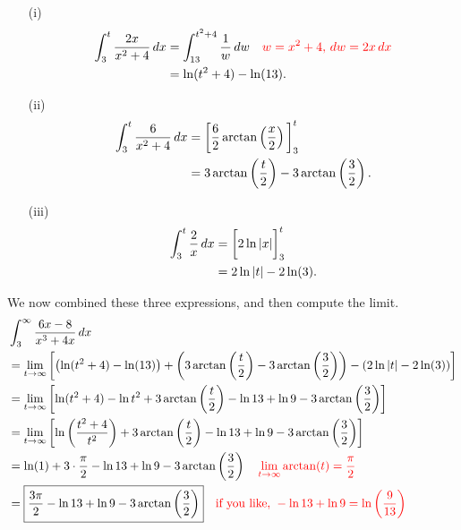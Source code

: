 \documentclass{ximera}
\begin{document}
\begin{problem}
\begin{enumerate}
\begin{freeResponse}
\begin{enumerate}
		\begin{enumerate}
		\item[(i)]  \begin{align*}
		\int_3^t \frac{2x}{x^2+4} \,d x &= \int_{13}^{t^2+4} \frac{1}{w} \,d w	\quad	{\color{red}w=x^2+4, \,dw = 2x \,dx}  \\
		&= \ln(t^2 +4) - \ln(13).
		\end{align*}
		
		\item[(ii)]  \begin{align*}
		\int_3^t \frac{6}{x^2+4} \,d x &= \bigg[ \frac{6}{2} \arctan \left( \frac{x}{2} \right)  \bigg]_3^t  \\
		&= 3 \arctan \left(\frac{t}{2} \right) - 3 \arctan \left( \frac{3}{2} \right).
		\end{align*}
		
		\item[(iii)]  \begin{align*}
		\int_3^t \frac{2}{x} \,d x &= \bigg[  2 \ln|x|  \bigg]_3^t  \\
		&= 2 \ln|t| - 2\ln(3).
		\end{align*}
		
		\end{enumerate}
	We now combined these three expressions, and then compute the limit.
		\begin{align*}
		&\int_3^\infty \frac{6x-8}{x^3+4x} \,d x  \\
		&= \lim_{t \to \infty} \left[ \left(\ln(t^2 +4) - \ln(13) \right) + \left( 3 \arctan \left(\frac{t}{2} \right) - 3 \arctan \left( \frac{3}{2} \right) \right) - \left( 2 \ln|t| - 2\ln(3) \right) \right]  \\
		&= \lim_{t \to \infty} \left[ \ln(t^2+4) - \ln t^2 + 3 \arctan \left( \frac{t}{2} \right) - \ln 13 + \ln 9 - 3 \arctan \left( \frac{3}{2} \right) \right]  \\
		&= \lim_{t \to \infty} \left[ \ln \left( \frac{t^2+4}{t^2} \right) + 3 \arctan \left( \frac{t}{2} \right) - \ln 13 + \ln 9 - 3 \arctan \left( \frac{3}{2} \right) \right]  \\
		&= \ln(1) + 3 \cdot \frac{\pi}{2} - \ln 13 + \ln 9 - 3 \arctan \left( \frac{3}{2} \right) 	\quad	{\color{red}\lim_{t \to \infty} \arctan(t) = \frac{\pi}{2}}\\
		&= \boxed{\frac{3\pi}{2} - \ln 13 + \ln 9 - 3 \arctan \left( \frac{3}{2} \right)}	\quad	{\color{red}\text{if you like, }- \ln 13 + \ln 9 = \ln \left( \frac{9}{13} \right)}
		\end{align*}
	
	\end{enumerate}
	\end{freeResponse}
	
	\end{enumerate}
\end{problem}
\end{document}

